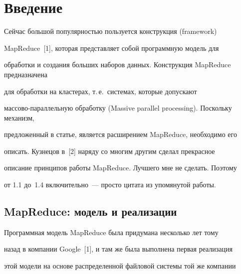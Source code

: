 







      \thispagestyle{headings}





      


            \label{st\stat}








\section{Введение}





      Сейчас большой популярностью пользуется конструкция (framework) 


MapReduce~[1], которая представляет собой программную модель для 


обработки и создания больших наборов данных. Конструкция MapReduce предназначена 


для обработки на кластерах, т.\,е.\ сис\-те\-мах, которые допускают 


мас\-со\-во-па\-рал\-лель\-ную обработку (Massive parallel processing). Поскольку механизм, 


предложенный в статье, является расширением MapReduce, необходимо его 


описать. Кузнецов в~[2] наряду со многим другим сделал прекрасное 


описание принципов работы MapReduce. Лучшего мне не сделать. Поэтому 


от 1.1 до~1.4 включительно~--- просто цитата из упомянутой работы. 





\subsection{MapReduce: модель и реализации}





      Программная модель MapReduce была придумана несколько лет тому 


назад в компании Google~[1], и там же была выполнена первая реализация 


этой модели на основе распределенной файловой системы той же компании 


